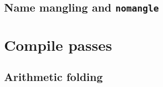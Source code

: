 \documentclass{article}
\begin{document}
\subsection{Name mangling and \texttt{nomangle}}
\label{sub:methods:mangle}

\section{Compile passes}
\label{sec:passes}

\subsection{Arithmetic folding}
\label{sub:passes:arithfold}
\end{document}
